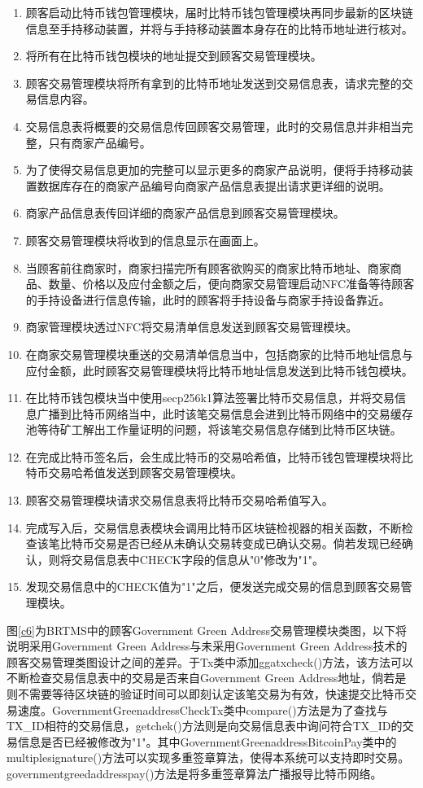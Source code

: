 	\begin{enumerate}
		\item 顾客启动比特币钱包管理模块，届时比特币钱包管理模块再同步最新的区块链信息至手持移动装置，并将与手持移动装置本身存在的比特币地址进行核对。
		\item 将所有在比特币钱包模块的地址提交到顾客交易管理模块。
		\item 顾客交易管理模块将所有拿到的比特币地址发送到交易信息表，请求完整的交易信息内容。
		\item 交易信息表将概要的交易信息传回顾客交易管理，此时的交易信息并非相当完整，只有商家产品编号。
		\item 为了使得交易信息更加的完整可以显示更多的商家产品说明，便将手持移动装置数据库存在的商家产品编号向商家产品信息表提出请求更详细的说明。
		\item 商家产品信息表传回详细的商家产品信息到顾客交易管理模块。
		\item 顾客交易管理模块将收到的信息显示在画面上。
		\item 当顾客前往商家时，商家扫描完所有顾客欲购买的商家比特币地址、商家商品、数量、价格以及应付金额之后，便向商家交易管理启动NFC准备等待顾客的手持设备进行信息传输，此时的顾客将手持设备与商家手持设备靠近。
		\item 商家管理模块透过NFC将交易清单信息发送到顾客交易管理模块。
		\item 在商家交易管理模块重送的交易清单信息当中，包括商家的比特币地址信息与应付金额，此时顾客交易管理模块将比特币地址信息发送到比特币钱包模块。
		\item 在比特币钱包模块当中使用secp256k1算法签署比特币交易信息，并将交易信息广播到比特币网络当中，此时该笔交易信息会进到⽐特币网络中的交易缓存池等待矿工解出工作量证明的问题，将该笔交易信息存储到比特币区块链。
		\item 在完成比特币签名后，会生成比特币的交易哈希值，比特币钱包管理模块将比特币交易哈希值发送到顾客交易管理模块。
		\item 顾客交易管理模块请求交易信息表将比特币交易哈希值写入。
		\item 完成写入后，交易信息表模块会调用比特币区块链检视器的相关函数，不断检查该笔比特币交易是否已经从未确认交易转变成已确认交易。倘若发现已经确认，则将交易信息表中CHECK字段的信息从"0"修改为"1"。
		\item 发现交易信息中的CHECK值为"1"之后，便发送完成交易的信息到顾客交易管理模块。
	\end{enumerate}

	图\ref{c6}为BRTMS中的顾客Government Green Address交易管理模块类图，以下将说明采用Government Green Address与未采用Government Green Address技术的顾客交易管理类图设计之间的差异。于Tx类中添加ggatxcheck()方法，该方法可以不断检查交易信息表中的交易是否来自Government Green Address地址，倘若是则不需要等待区块链的验证时间可以即刻认定该笔交易为有效，快速提交比特币交易速度。GovernmentGreenaddressCheckTx类中compare()方法是为了查找与TX\_ID相符的交易信息，getchek()方法则是向交易信息表中询问符合TX\_ID的交易信息是否已经被修改为"1"。其中GovernmentGreenaddressBitcoinPay类中的multiplesignature()方法可以实现多重签章算法，使得本系统可以支持即时交易。governmentgreedaddresspay()方法是将多重签章算法广播报导比特币网络。



